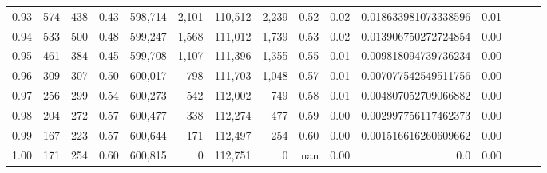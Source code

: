 \begin{tabular}{rrrrrrrrrrrrrrr}
0.93 &     574 &    438 &  0.43 &  598,714 &    2,101 &  110,512 &    2,239 &  0.52 &  0.02 &  0.018633981073338596 &      0.01 \\
0.94 &     533 &    500 &  0.48 &  599,247 &    1,568 &  111,012 &    1,739 &  0.53 &  0.02 &  0.013906750272724854 &      0.00 \\
0.95 &     461 &    384 &  0.45 &  599,708 &    1,107 &  111,396 &    1,355 &  0.55 &  0.01 &  0.009818094739736234 &      0.00 \\
0.96 &     309 &    307 &  0.50 &  600,017 &      798 &  111,703 &    1,048 &  0.57 &  0.01 &  0.007077542549511756 &      0.00 \\
0.97 &     256 &    299 &  0.54 &  600,273 &      542 &  112,002 &      749 &  0.58 &  0.01 &  0.004807052709066882 &      0.00 \\
0.98 &     204 &    272 &  0.57 &  600,477 &      338 &  112,274 &      477 &  0.59 &  0.00 &  0.002997756117462373 &      0.00 \\
0.99 &     167 &    223 &  0.57 &  600,644 &      171 &  112,497 &      254 &  0.60 &  0.00 &  0.001516616260609662 &      0.00 \\
1.00 &     171 &    254 &  0.60 &  600,815 &        0 &  112,751 &        0 &   nan &  0.00 &                   0.0 &      0.00 \\
\bottomrule
\end{tabular}
